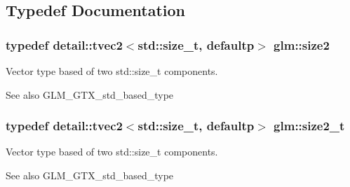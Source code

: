 \subsection{Typedef Documentation}
\subsubsection[{\texorpdfstring{size2}{size2}}]{\setlength{\rightskip}{0pt plus 5cm}typedef detail\+::tvec2$<$std\+::size\+\_\+t, defaultp$>$ {\bf glm\+::size2}}\hypertarget{group__gtx__std__based__type_ga393e8beba20ea33452384087a2864f86}{}\label{group__gtx__std__based__type_ga393e8beba20ea33452384087a2864f86}
Vector type based of two std\+::size\+\_\+t components. \begin{DoxySeeAlso}{See also}
G\+L\+M\+\_\+\+G\+T\+X\+\_\+std\+\_\+based\+\_\+type 
\end{DoxySeeAlso}
\subsubsection[{\texorpdfstring{size2\+\_\+t}{size2_t}}]{\setlength{\rightskip}{0pt plus 5cm}typedef detail\+::tvec2$<$std\+::size\+\_\+t, defaultp$>$ {\bf glm\+::size2\+\_\+t}}\hypertarget{group__gtx__std__based__type_ga64be170f9203528ff59efa40b1977bb0}{}\label{group__gtx__std__based__type_ga64be170f9203528ff59efa40b1977bb0}
Vector type based of two std\+::size\+\_\+t components. \begin{DoxySeeAlso}{See also}
G\+L\+M\+\_\+\+G\+T\+X\+\_\+std\+\_\+based\+\_\+type 
\end{DoxySeeAlso}
